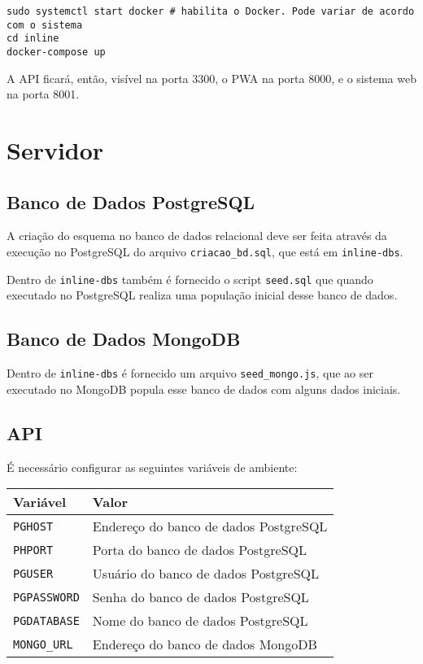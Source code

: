 \documentclass{book}
\begin{document}
\begin{verbatim}
sudo systemctl start docker # habilita o Docker. Pode variar de acordo com o sistema
cd inline
docker-compose up
\end{verbatim}

A API ficará, então, visível na porta 3300, o PWA na porta 8000, e o sistema web
na porta 8001.

\section{Servidor}
\subsection{Banco de Dados PostgreSQL}

A criação do esquema no banco de dados relacional deve ser feita através da
execução no PostgreSQL do arquivo \verb|criacao_bd.sql|, que está em
\verb|inline-dbs|.

Dentro de \verb|inline-dbs| também é fornecido o script \verb|seed.sql| que
quando executado no PostgreSQL realiza uma população inicial desse banco de
dados.

\subsection{Banco de Dados MongoDB}

Dentro de \verb|inline-dbs| é fornecido um arquivo \verb|seed_mongo.js|, que ao
ser executado no MongoDB popula esse banco de dados com alguns dados iniciais.

\subsection{API}
É necessário configurar as seguintes variáveis de ambiente:

\begin{center}
\begin{tabular}{|l|l|}
\hline
Variável & Valor \\
\hline
\verb|PGHOST| & Endereço do banco de dados PostgreSQL \\
\hline
\verb|PHPORT| & Porta do banco de dados PostgreSQL \\
\hline
\verb|PGUSER| & Usuário do banco de dados PostgreSQL \\
\hline
\verb|PGPASSWORD| & Senha do banco de dados PostgreSQL \\
\hline
\verb|PGDATABASE| & Nome do banco de dados PostgreSQL \\
\hline
\verb|MONGO_URL| & Endereço do banco de dados MongoDB \\
\hline
\end{tabular}
\end{center}
\end{document}
